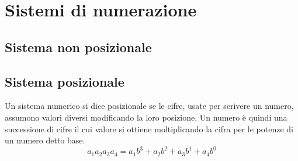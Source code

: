 \chapter{Sistemi di numerazione}
\label{cha:Sistemi di numerazione}
\section{Sistema non posizionale}
\label{sec:sistemanonposizionale}

\section{Sistema posizionale} 
\label{sec:sistemaposizionale}
Un sistema numerico si dice posizionale se le cifre, usate per scrivere un numero, assumono valori diversi modificando la loro posizione.
Un numero è quindi una successione di cifre il cui valore si ottiene moltiplicando la cifra per le potenze di un numero detto base. \[a_1a_2a_3a_4=a_1b^3+a_2b^2+a_3b^1+a_4b^0\] 
